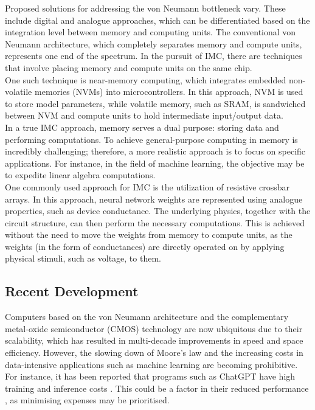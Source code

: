 \noindent Proposed solutions for addressing the von Neumann bottleneck vary. These include digital and analogue approaches, which can be differentiated based on the integration level between memory and computing units. The conventional von Neumann architecture, which completely separates memory and compute units, represents one end of the spectrum. In the pursuit of IMC, there are techniques that involve placing memory and compute units on the same chip. \\

\noindent One such technique is near-memory computing, which integrates embedded non-volatile memories (NVMs) into microcontrollers. In this approach, NVM is used to store model parameters, while volatile memory, such as SRAM, is sandwiched between NVM and compute units to hold intermediate input/output data. \\

\noindent In a true IMC approach, memory serves a dual purpose: storing data and performing computations. To achieve general-purpose computing in memory is incredibly challenging; therefore, a more realistic approach is to focus on specific applications. For instance, in the field of machine learning, the objective may be to expedite linear algebra computations. \\

\noindent One commonly used approach for IMC is the utilization of resistive crossbar arrays. In this approach, neural network weights are represented using analogue properties, such as device conductance. The underlying physics, together with the circuit structure, can then perform the necessary computations. This is achieved without the need to move the weights from memory to compute units, as the weights (in the form of conductances) are directly operated on by applying physical stimuli, such as voltage, to them.

\subsection[Recent Development]{Recent Development}

Computers based on the von Neumann architecture and the complementary metal-oxide semiconductor (CMOS) technology are now ubiquitous due to their scalability, which has resulted in multi-decade improvements in speed and space efficiency. However, the slowing down of Moore's law and the increasing costs in data-intensive applications such as machine learning are becoming prohibitive. For instance, it has been reported that programs such as ChatGPT have high training and inference costs \cite{mok2023chatgpt}. This could be a factor in their reduced performance \cite{chen2023chatgpt}, as minimising expenses may be prioritised. \\


